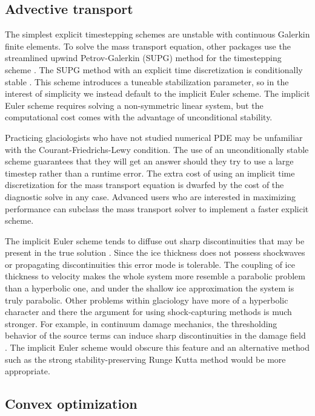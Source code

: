 \documentclass{article}
\theoremstyle{definition}
\theoremstyle{plain}
\begin{document}
\subsection{Advective transport} \label{sec:prognostic-model}

The simplest explicit timestepping schemes are unstable with continuous Galerkin finite elements.
To solve the mass transport equation, other packages use the streamlined upwind Petrov-Galerkin (SUPG) method for the timestepping scheme \citep{brinkerhoff2013data, larour2012continental}.
The SUPG method with an explicit time discretization is conditionally stable \citep{donea2003finite}.
This scheme introduces a tuneable stabilization parameter, so in the interest of simplicity we instead default to the implicit Euler scheme.
The implicit Euler scheme requires solving a non-symmetric linear system, but the computational cost comes with the advantage of unconditional stability.

Practicing glaciologists who have not studied numerical PDE may be unfamiliar with the Courant-Friedrichs-Lewy condition.
The use of an unconditionally stable scheme guarantees that they will get an answer should they try to use a large timestep rather than a runtime error.
The extra cost of using an implicit time discretization for the mass transport equation is dwarfed by the cost of the diagnostic solve in any case.
Advanced users who are interested in maximizing performance can subclass the mass transport solver to implement a faster explicit scheme.

The implicit Euler scheme tends to diffuse out sharp discontinuities that may be present in the true solution \citep{donea2003finite}.
Since the ice thickness does not possess shockwaves or propagating discontinuities this error mode is tolerable.
The coupling of ice thickness to velocity makes the whole system more resemble a parabolic problem than a hyperbolic one, and under the shallow ice approximation the system is truly parabolic.
Other problems within glaciology have more of a hyperbolic character and there the argument for using shock-capturing methods is much stronger.
For example, in continuum damage mechanics, the thresholding behavior of the source terms can induce sharp discontinuities in the damage field \citep{albrecht2014fracture}.
The implicit Euler scheme would obscure this feature and an alternative method such as the strong stability-preserving Runge Kutta method would be more appropriate.


\subsection{Convex optimization}
\end{document}
